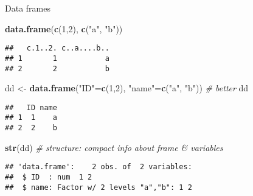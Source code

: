 \documentclass[ignorenonframetext,]{beamer}
\newenvironment{Shaded}{\begin{snugshade}}{\end{snugshade}}
\newcommand{\CommentTok}[1]{\textcolor[rgb]{0.56,0.35,0.01}{\textit{#1}}}
\newcommand{\DecValTok}[1]{\textcolor[rgb]{0.00,0.00,0.81}{#1}}
\newcommand{\KeywordTok}[1]{\textcolor[rgb]{0.13,0.29,0.53}{\textbf{#1}}}
\newcommand{\NormalTok}[1]{#1}
\newcommand{\StringTok}[1]{\textcolor[rgb]{0.31,0.60,0.02}{#1}}
\begin{document}
\begin{frame}[fragile]{Data frames}
\protect\hypertarget{data-frames}{}

\footnotesize

\begin{Shaded}
\begin{Highlighting}[]
\KeywordTok{data.frame}\NormalTok{(}\KeywordTok{c}\NormalTok{(}\DecValTok{1}\NormalTok{,}\DecValTok{2}\NormalTok{), }\KeywordTok{c}\NormalTok{(}\StringTok{"a"}\NormalTok{, }\StringTok{"b"}\NormalTok{))}
\end{Highlighting}
\end{Shaded}

\begin{verbatim}
##   c.1..2. c..a....b..
## 1       1           a
## 2       2           b
\end{verbatim}

\begin{Shaded}
\begin{Highlighting}[]
\NormalTok{dd <-}\StringTok{ }\KeywordTok{data.frame}\NormalTok{(}\StringTok{"ID"}\NormalTok{=}\KeywordTok{c}\NormalTok{(}\DecValTok{1}\NormalTok{,}\DecValTok{2}\NormalTok{), }\StringTok{"name"}\NormalTok{=}\KeywordTok{c}\NormalTok{(}\StringTok{"a"}\NormalTok{, }\StringTok{"b"}\NormalTok{)) }\CommentTok{# better}
\NormalTok{dd}
\end{Highlighting}
\end{Shaded}

\begin{verbatim}
##   ID name
## 1  1    a
## 2  2    b
\end{verbatim}

\begin{Shaded}
\begin{Highlighting}[]
\KeywordTok{str}\NormalTok{(dd) }\CommentTok{# structure: compact info about frame & variables}
\end{Highlighting}
\end{Shaded}

\begin{verbatim}
## 'data.frame':    2 obs. of  2 variables:
##  $ ID  : num  1 2
##  $ name: Factor w/ 2 levels "a","b": 1 2
\end{verbatim}

\end{frame}
\end{document}
